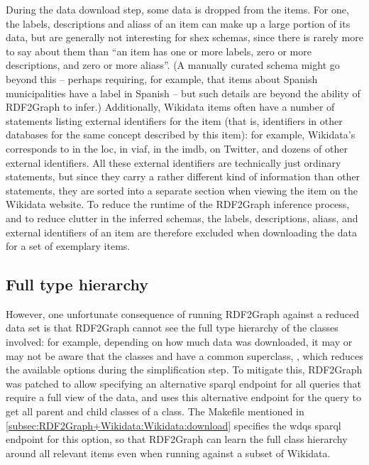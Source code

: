 During the data download step, some data is dropped from the \glspl{item}.
For one, the \glspl{label}, \glspl{description} and \glspl{alias} of an \gls{item} can make up a large portion of its data,
but are generally not interesting for \gls{shex} schemas,
since there is rarely more to say about them than
“an \gls{item} has one or more \glspl{label}, zero or more \glspl{description}, and zero or more \glspl{alias}”.
(A manually curated \gls{schema} might go beyond this –
perhaps requiring, for example, that \glspl{item} about Spanish municipalities have a label in Spanish –
but such details are beyond the ability of \gls{RDF2Graph} to infer.)
Additionally, \gls{Wikidata} \glspl{item} often have a number of \glspl{statement} listing external identifiers for the \gls{item}
(that is, identifiers in other databases for the same concept described by this \gls{item}):
for example, \gls{Wikidata}’s  corresponds to  in the \gls{loc},
 in \gls{viaf},
 in the \gls{imdb},
 on Twitter,
and dozens of other external identifiers.
All these external identifiers are technically just ordinary \glspl{statement},
but since they carry a rather different kind of information than other \glspl{statement},
they are sorted into a separate section when viewing the \gls{item} on the \gls{Wikidata} website.
To reduce the runtime of the \gls{RDF2Graph} inference process,
and to reduce clutter in the inferred \glspl{schema},
the \glspl{label}, \glspl{description}, \glspl{alias}, and external identifiers of an \gls{item}
are therefore excluded when downloading the data for a set of exemplary \glspl{item}.

\subsection{Full type hierarchy}
\label{subsec:RDF2Graph+Wikidata:Wikidata:hierarchy}

However, one unfortunate consequence of running \gls{RDF2Graph} against a reduced data set
is that \gls{RDF2Graph} cannot see the full type hierarchy of the classes involved:
for example, depending on how much data was downloaded,
it may or may not be aware that the classes  and 
have a common superclass, ,
which reduces the available options during the simplification step. %
To mitigate this, \gls{RDF2Graph} was patched
to allow specifying an alternative \gls{sparql} endpoint for all queries that require a full view of the data,
and uses this alternative endpoint for the query to get all parent and child classes of a class.
The Makefile mentioned in \cref{subsec:RDF2Graph+Wikidata:Wikidata:download}
specifies the \gls{wdqs} \gls{sparql} endpoint for this option,
so that \gls{RDF2Graph} can learn the full class hierarchy around all relevant items %
even when running against a subset of \gls{Wikidata}. %

